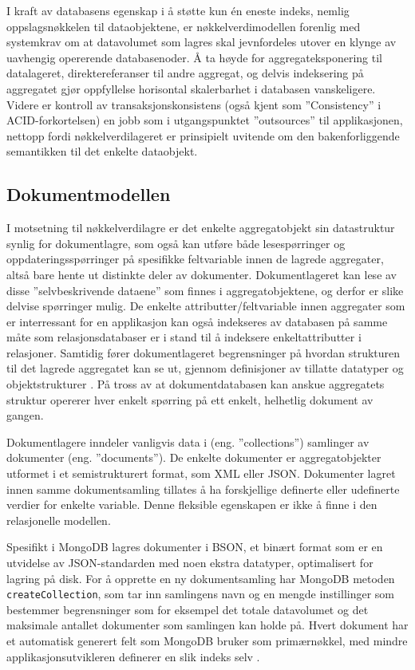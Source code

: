 I kraft av databasens egenskap i å støtte kun én eneste indeks, nemlig oppslagsnøkkelen til dataobjektene, er nøkkelverdimodellen forenlig med systemkrav om at datavolumet som lagres skal jevnfordeles utover en klynge av uavhengig opererende databasenoder. Å ta høyde for aggregateksponering til datalageret, direktereferanser til andre aggregat, og delvis indeksering på aggregatet gjør oppfyllelse horisontal skalerbarhet i databasen vanskeligere. Videre er kontroll av transaksjonskonsistens (også kjent som ''Consistency'' i ACID-forkortelsen) en jobb som i utgangspunktet ''outsources'' til applikasjonen, nettopp fordi nøkkelverdilageret er prinsipielt uvitende om den bakenforliggende semantikken til det enkelte dataobjekt.

\subsection{Dokumentmodellen}

I motsetning til nøkkelverdilagre er det enkelte aggregatobjekt sin datastruktur synlig for dokumentlagre, som også kan utføre både lesespørringer og oppdateringsspørringer på spesifikke feltvariable innen de lagrede aggregater, altså bare hente ut distinkte deler av dokumenter. Dokumentlageret kan lese av disse ''selvbeskrivende dataene'' \citep{sadalage2013, elmasri2014} som finnes i aggregatobjektene, og derfor er slike delvise spørringer mulig. De enkelte attributter/feltvariable innen aggregater som er interressant for en applikasjon kan også indekseres av databasen på samme måte som relasjonsdatabaser er i stand til å indeksere enkeltattributter i relasjoner. Samtidig fører dokumentlageret begrensninger på hvordan strukturen til det lagrede aggregatet kan se ut, gjennom definisjoner av tillatte datatyper og objektstrukturer \citep{sadalage2013}. På tross av at dokumentdatabasen kan anskue aggregatets struktur opererer hver enkelt spørring på ett enkelt, helhetlig dokument av gangen.

Dokumentlagere inndeler vanligvis data i (eng. ''collections'') samlinger av dokumenter (eng. ''documents''). De enkelte dokumenter er aggregatobjekter utformet i et semistrukturert format, som XML eller JSON. Dokumenter lagret innen samme dokumentsamling tillates å ha forskjellige definerte eller udefinerte verdier for enkelte variable. Denne fleksible egenskapen er ikke å finne i den relasjonelle modellen.

Spesifikt i MongoDB lagres dokumenter i BSON, et binært format som er en utvidelse av JSON-standarden med noen ekstra datatyper, optimalisert for lagring på disk. For å opprette en ny dokumentsamling har MongoDB metoden \texttt{createCollection}, som tar inn samlingens navn og en mengde instillinger som bestemmer begrensninger som for eksempel det totale datavolumet og det maksimale antallet dokumenter som samlingen kan holde på. Hvert dokument har et automatisk generert felt som MongoDB bruker som primærnøkkel, med mindre applikasjonsutvikleren definerer en slik indeks selv \citep{elmasri2014}.

